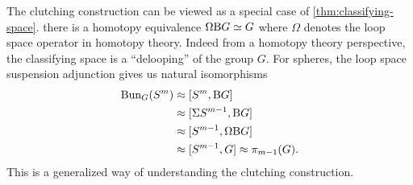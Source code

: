 \begin{remark}
	The clutching construction can be viewed as a special case of \cref{thm:classifying-space}.
	 there is a homotopy equivalence $\Omega \mathrm{B} G \simeq G$ where $\Omega$ denotes the loop space operator in homotopy theory. Indeed from a homotopy theory perspective, the classifying space is a ``delooping'' of the group $G$. For spheres, the loop space suspension adjunction gives us natural isomorphisms
	\[
		\begin{aligned}
			\operatorname{Bun}_{G}(S^m) & \approx [S^m, \mathrm{B} G]            \\
			              & \approx [\Sigma S^{m-1}, \mathrm{B} G] \\
			              & \approx [S^{m-1}, \Omega\mathrm{B} G]  \\
			              & \approx [S^{m-1}, G]
			\approx \pi_{m-1}(G).
		\end{aligned}
	\]
	This is a generalized way of understanding the clutching construction.
\end{remark}
